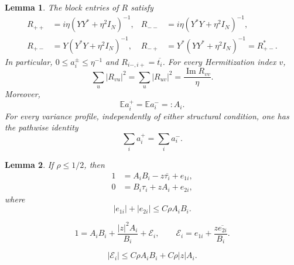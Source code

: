 \documentclass[10pt,a4paper]{amsart}
\newtheorem{lemma}{Lemma}
\begin{document}
\begin{lemma}\label{lem:coarse-ward}
The block entries of $R$ satisfy
\begin{align}
 R_{++}&=i\eta(YY^*+\eta^2I_N)^{-1},&
 R_{--}&=i\eta(Y^*Y+\eta^2I_N)^{-1},
 \label{eq:coarse-diagonal-blocks}\\
 R_{+-}&=Y(Y^*Y+\eta^2I_N)^{-1},&
 R_{-+}&=Y^*(YY^*+\eta^2I_N)^{-1}=R_{+-}^*.
 \label{eq:coarse-offdiagonal-blocks}
\end{align}
In particular, $0\le a_i^\pm\le\eta^{-1}$ and
$R_{i-,i+}=\overline{t_i}$.  For every Hermitization index $v$,
\begin{equation}\label{eq:coarse-ward}
 \sum_u|R_{vu}|^2=\sum_u|R_{uv}|^2
 =\frac{\operatorname{Im}R_{vv}}{\eta}.
\end{equation}
Moreover,
\begin{equation}\label{eq:coarse-transpose-means}
 \mathbb E a_i^+=\mathbb E a_i^-=:A_i.
\end{equation}
For every variance profile, independently of either structural condition,
one has the pathwise identity
\begin{equation}\label{eq:coarse-exact-trace-balance}
 \sum_i a_i^+=\sum_i a_i^-.
\end{equation}
\end{lemma}

\begin{lemma}\label{lem:coarse-expectation-equations}
If $\rho\le1/2$, then
\begin{align}
 1&=A_iB_i-z\overline{\tau_i}+e_{1i},
 \label{eq:coarse-SD-diagonal}\\
 0&=B_i\tau_i+zA_i+e_{2i},
 \label{eq:coarse-SD-offdiagonal}
\end{align}
where
\begin{equation}\label{eq:coarse-error-bound}
 |e_{1i}|+|e_{2i}|\le C\rho A_iB_i.
\end{equation}
\end{lemma}

\begin{equation}\label{eq:coarse-scalar-equation}
 1=A_iB_i+\frac{|z|^2A_i}{B_i}+\mathcal E_i,
 \qquad
 \mathcal E_i=e_{1i}+\frac{z\overline{e_{2i}}}{B_i}.
\end{equation}

\begin{equation}\label{eq:coarse-scalar-error}
 |\mathcal E_i|\le C\rho A_iB_i+C\rho|z|A_i.
\end{equation}
\end{document}
